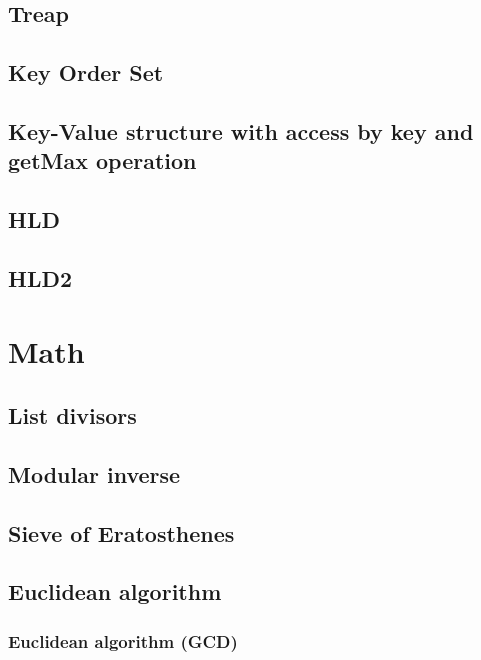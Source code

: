 \documentclass[a4paper]{article}
\begin{document}
\begin{multicols*}{2}
    \subsection{Treap}
        
    \subsection{Key Order Set}
        
    \subsection{Key-Value structure with access by key and getMax operation}
        
    \subsection{HLD}
        
    \subsection{HLD2}
            

\section{Math}
    \subsection{List divisors}
        
    \subsection{Modular inverse}
        
    \subsection{Sieve of Eratosthenes}
        
    \subsection{Euclidean algorithm}
        \subsubsection{Euclidean algorithm (GCD)}
            

\end{multicols*}
\end{document}
